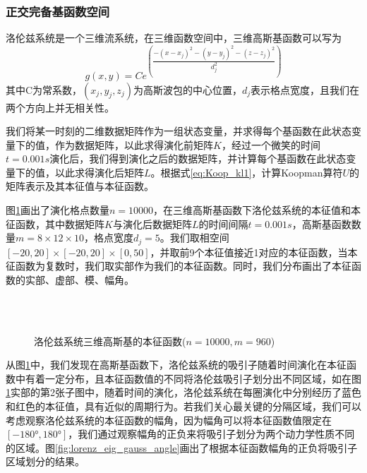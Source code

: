 \subsubsection{正交完备基函数空间}
洛伦兹系统是一个三维流系统，在三维函数空间中，三维高斯基函数可以写为
\begin{equation}
  g(x,y)=Ce^{({\dfrac{-(x-x_j)^2-(y-y_j)^2-(z-z_j)^2}{d_j^2}})}
\end{equation}
其中C为常系数，$(x_j,y_j,z_j)$为高斯波包的中心位置，$d_j$表示格点宽度，且我们在两个方向上并无相关性。

我们将某一时刻的二维数据矩阵作为一组状态变量，并求得每个基函数在此状态变量下的值，作为数据矩阵，以此求得演化前矩阵$K$，经过一个微笑的时间$t=0.001s$演化后，我们得到演化之后的数据矩阵，并计算每个基函数在此状态变量下的值，以此求得演化后矩阵$L$。根据式\eqref{eq:Koop_kl1}，计算Koopman算符$U$的矩阵表示及其本征值与本征函数。

图\ref{fig:lorenz_eig_gauss}画出了演化格点数量$n=10000$，在三维高斯基函数下洛伦兹系统的本征值和本征函数，其中数据矩阵$K$与演化后数据矩阵$L$的时间间隔$t=0.001s$，高斯基函数数量$m=8\times 12\times 10$，格点宽度$d_j=5$。我们取相空间$[-20,20]\times [-20,20]\times [0,50]$，并取前9个本征值接近1对应的本征函数，当本征函数为复数时，我们取实部作为我们的本征函数。同时，我们分布画出了本征函数的实部、虚部、模、幅角。
\begin{figure}
    \centering
    \\
    \\
    \caption{洛伦兹系统三维高斯基的本征函数($n=10000,m=960$)}\label{fig:lorenz_eig_gauss}
\end{figure}

从图\ref{fig:lorenz_eig_gauss}中，我们发现在高斯基函数下，洛伦兹系统的吸引子随着时间演化在本征函数中有着一定分布，且本征函数值的不同将洛伦兹吸引子划分出不同区域，如在图\ref{fig:lorenz_eig_gauss}实部的第2张子图中，随着时间的演化，洛伦兹系统在每圈演化中分别经历了蓝色和红色的本征值，具有近似的周期行为。若我们关心最关键的分隔区域，我们可以考虑观察洛伦兹系统的本征函数的幅角，因为幅角可以将本征函数值限定在$[-180°,180°]$，我们通过观察幅角的正负来将吸引子划分为两个动力学性质不同的区域。图\ref{fig:lorenz_eig_gauss_angle}画出了根据本征函数幅角的正负将吸引子区域划分的结果。


